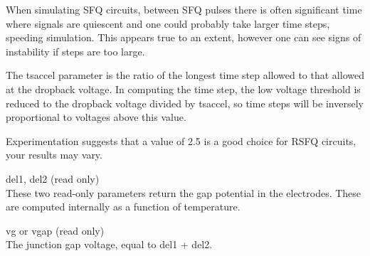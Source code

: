 \begin{description}
When simulating SFQ circuits, between SFQ pulses there is often
significant time where signals are quiescent and one could probably
take larger time steps, speeding simulation.  This appears true to an
extent, however one can see signs of instability if steps are too
large.

The {\vt tsaccel} parameter is the ratio of the longest time step
allowed to that allowed at the dropback voltage.  In computing the
time step, the low voltage threshold is reduced to the dropback
voltage divided by {\vt tsaccel}, so time steps will be inversely
proportional to voltages above this value.

Experimentation suggests that a value of 2.5 is a good choice for RSFQ
circuits, your results may vary.

\item{\vt del1}, {\vt del2} (read only)\\
These two read-only parameters return the gap potential in the
electrodes.  These are computed internally as a function of
temperature.

\item{\vt vg} or {\vt vgap} (read only)\\
The junction gap voltage, equal to {\vt del1 + del2}.
\end{description}

